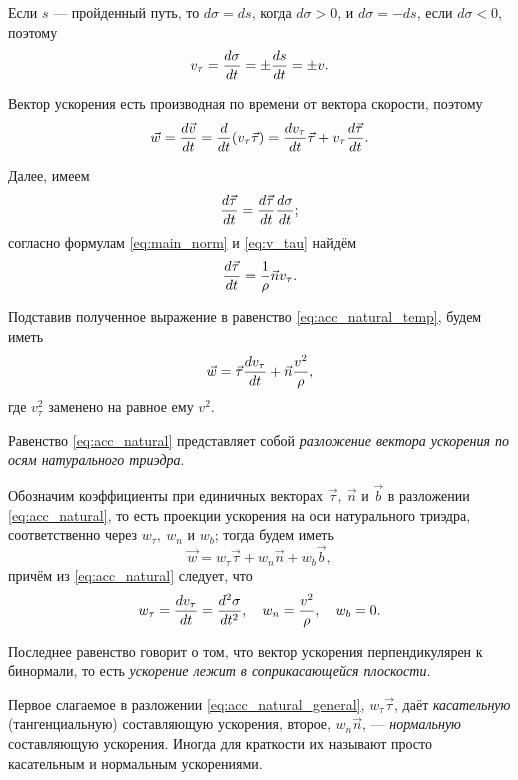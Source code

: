 Если $s$ --- пройденный путь, то $d \sigma = ds$, когда $d \sigma > 0$, и
$d \sigma = -ds$, если $d \sigma <0$, поэтому
\begin{equation}
  \label{eq:v_tau}
  v_\tau = \dt[\sigma] = \pm \dt[s] = \pm v.
\end{equation}

Вектор ускорения есть производная по времени от вектора скорости, поэтому
\begin{equation}
  \label{eq:acc_natural_temp}
  \vec{w} = \dt[\vec{v}] = \dt (v_\tau \vec{\tau}) = \dt[v_\tau] \vec{\tau} +
    v_\tau \dt[\vec{\tau}].
\end{equation}

Далее, имеем
\begin{equation*}
  \dt[\vec{\tau}] = \dt[\vec{\tau}] \dt[\sigma];
\end{equation*}
согласно формулам \ref{eq:main_norm} и \ref{eq:v_tau} найдём
\begin{equation*}
  \dt[\vec{\tau}] = \frac{1}{\rho} \vec{n} v_\tau.
\end{equation*}

Подставив полученное выражение в равенство \ref{eq:acc_natural_temp}, будем
иметь
\begin{equation}
  \label{eq:acc_natural}
  \vec{w} = \vec{\tau} \dt[v_\tau] + \vec{n} \frac{v^2}{\rho},
\end{equation}
где $v_\tau^2$ заменено на равное ему $v^2$.

Равенство \ref{eq:acc_natural} представляет собой \textit{разложение вектора
ускорения по осям натурального триэдра}.

Обозначим коэффициенты при единичных векторах $\vec{\tau},~\vec{n}$ и $\vec{b}$
в разложении \ref{eq:acc_natural}, то есть проекции ускорения на оси
натурального триэдра, соответственно через $w_\tau,~w_n$ и $w_b$; тогда будем
иметь
\begin{equation}
  \label{eq:acc_natural_general}
  \vec{w} = w_\tau \vec{\tau} + w_n \vec{n} + w_b \vec{b},
\end{equation}
причём из \autoref{eq:acc_natural} следует, что
\begin{equation*}
  w_\tau = \dt[v_\tau] = \ddt[\sigma], \quad w_n = \frac{v^2}{\rho},
    \quad w_b = 0.
\end{equation*}

Последнее равенство говорит о том, что вектор ускорения перпендикулярен к
бинормали, то есть \textit{ускорение лежит в соприкасающейся плоскости}.

Первое слагаемое в разложении \ref{eq:acc_natural_general}, $w_\tau \vec{\tau}$,
даёт \textit{касательную} (тангенциальную) составляющую ускорения, второе, $w_n
\vec{n}$, --- \textit{нормальную} составляющую ускорения. Иногда для краткости
их называют просто касательным и нормальным ускорениями.

